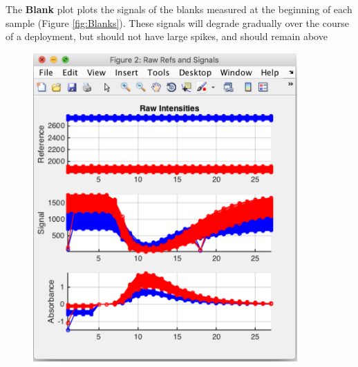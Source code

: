 The \textbf{Blank} plot plots the signals of the blanks measured at the beginning of each sample (Figure \ref{fig:Blanks}).  These signals will degrade gradually over the course of a deployment, but should not have large spikes, and should remain above \ifcase {}  \fi

\begin{figure}[!h]
\begin{minipage}[t]{0.45\textwidth}
\centering
\includegraphics[width=0.9\textwidth]{figs/Intensities.png}
\end{minipage}


\end{figure}
